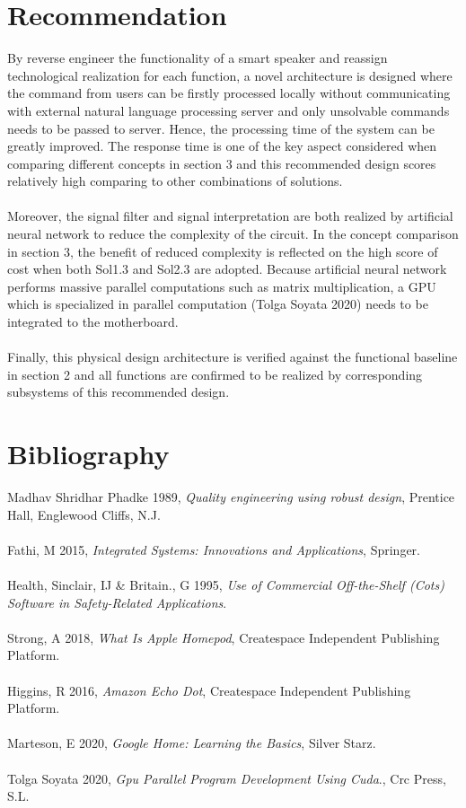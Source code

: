 \documentclass{article}
\begin{document}
\section{Recommendation}
By reverse engineer the functionality of a smart speaker and reassign technological realization for each function, a novel architecture is designed where the command from users can be firstly processed locally without communicating with external natural language processing server and only unsolvable commands needs to be passed to server. Hence, the processing time of the system can be greatly improved. The response time is one of the key aspect considered when comparing different concepts in section 3 and this recommended design scores relatively high comparing to other combinations of solutions.\\\\
Moreover, the signal filter and signal interpretation are both realized by artificial neural network to reduce the complexity of the circuit. In the concept comparison in section 3, the benefit of reduced complexity is reflected on the high score of cost when both Sol1.3 and Sol2.3 are adopted. Because artificial neural network performs massive parallel computations such as matrix multiplication, a GPU which is specialized in parallel computation (Tolga Soyata 2020) needs to be integrated to the motherboard.\\\\
Finally, this physical design architecture is verified against the functional baseline in section 2 and all functions are confirmed to be realized by corresponding subsystems of this recommended design.
\section*{Bibliography}
Madhav Shridhar Phadke 1989, \textit{Quality engineering using robust design}, Prentice Hall, Englewood Cliffs, N.J.\\\\
Fathi, M 2015, \textit{Integrated Systems: Innovations and Applications}, Springer.\\\\
Health, Sinclair, IJ \& Britain., G 1995, \textit{Use of Commercial Off-the-Shelf (Cots) Software in Safety-Related Applications}.\\\\
Strong, A 2018, \textit{What Is Apple Homepod}, Createspace Independent Publishing Platform.\\\\
Higgins, R 2016, \textit{Amazon Echo Dot}, Createspace Independent Publishing Platform.\\\\
Marteson, E 2020, \textit{Google Home: Learning the Basics}, Silver Starz.\\\\
Tolga Soyata 2020, \textit{Gpu Parallel Program Development Using Cuda}., Crc Press, S.L.
\end{document}
